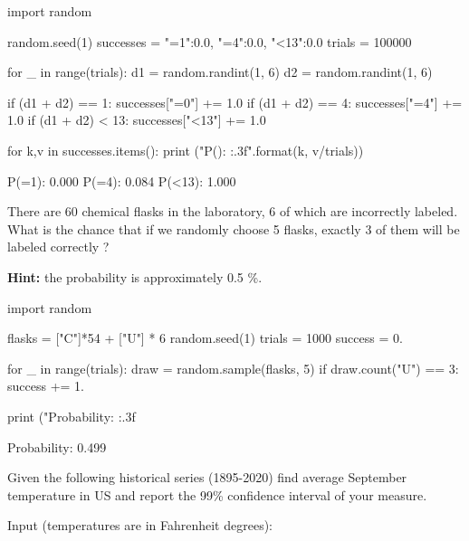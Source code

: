 \begin{solution}
\end{solution}

\begin{ipython}
import random

random.seed(1)
successes = {"=1":0.0, "=4":0.0, "<13":0.0}
trials = 100000

for _ in range(trials):
    d1 = random.randint(1, 6)
    d2 = random.randint(1, 6)

    if (d1 + d2) == 1:
        successes["=0"] += 1.0
    if (d1 + d2) == 4:
        successes["=4"] += 1.0
    if (d1 + d2) < 13:
        successes["<13"] += 1.0

for k,v in successes.items():
    print ("P({}): {:.3f}".format(k, v/trials))

P(=1): 0.000
P(=4): 0.084
P(<13): 1.000
\end{ipython}

\begin{question}
There are 60 chemical flasks in the laboratory, 6 of which are incorrectly labeled. What is the chance that if we randomly choose 5 flasks, exactly 3 of them will be labeled correctly ?

\noindent\textbf{Hint:} the probability is approximately 0.5 \%.
\end{question}

\begin{solution}
\end{solution}

\begin{ipython}
import random

flasks = ["C"]*54 + ["U"] * 6
random.seed(1)
trials = 1000
success = 0.

for _ in range(trials):
    draw = random.sample(flasks, 5)
    if draw.count("U") == 3:
        success += 1.

print ("Probability: {:.3f}%

Probability: 0.499%
\end{ipython}

\begin{question}
Given the following historical series (1895-2020) find average September temperature in US and report the 99\% confidence interval of your measure.

Input (temperatures are in Fahrenheit degrees):
\end{question}

